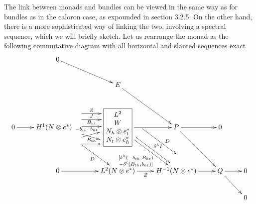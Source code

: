 \documentclass[12pt]{article}
\theoremstyle{definition}
\theoremstyle{remark}
\numberwithin{theorem}{section}
\begin{document}
 
 The link between monads and bundles can be viewed in the same way as for bundles as in the caloron case, as expounded in section 3.2.5. On the other hand, there is a more sophisticated way of linking the  two, involving a spectral sequence, which we will briefly sketch. 
Let us rearrange the monad as the following commutative diagram with all horizontal and slanted sequences exact\newline
\begin{align}\label{primitive-monad}
\xymatrix @C=2pc{
 &0\ar[dr]\\
&&{E}\ar[dr]\\
0\ar[r]&H^1(N\otimes e^*)\ar[dr]_-{D}
\phantom{\begin{matrix} L\\W\\ e\\ e\end{matrix}}
\ar@<4.6ex>[r]^-{Z}
\ar@<2.6ex>[r]^-{J}
\ar@<.3ex>[r]^-{B_{ht}}
\ar[r]+(-9,-6)^{-b_{th}}
\ar[]!<0ex,-5.5ex>;[r]!<0ex,-5.5ex>+(-9,6)^(0.9){b_{ht}}
\ar@<-5.5ex>[r]^-{B_{th}}
& \boxed{\begin{matrix} L^2\\W\\N_h\otimes e_t^*\\N_t\otimes e_h^*\end{matrix}}\ar[r]
\ar@<4.6ex>[dr]^(0.65){D}
\ar@<1ex>[dr]^-{\delta^\lambda I}
\ar[dr]_-{\begin{smallmatrix}[\delta^h(-b_{th},B_{ht})\\-\delta^t(B_{th},b_{ht})]\end{smallmatrix}}
& P\ar[r]\ar[dr] & 0\\
&0\ar[r] & L^2(N\otimes e^*)\ar[r]_-{Z}&H^{-1}(N\otimes e^*)\ar[r]&Q\ar[r]\ar[dr]&0\\
& &&&&0
}
\end{align}
\end{document}
